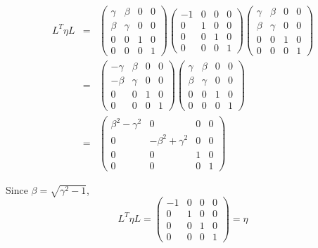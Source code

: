 \documentclass[12pt,a4paper]{article}
\begin{document}
\begin{enumerate}
\begin{eqnarray}
L^T \eta L 
&=& 
\begin{pmatrix}
\gamma & \beta & 0 & 0 \\
\beta & \gamma & 0  & 0 \\
0 & 0 & 1 & 0 \\
0 & 0 & 0 & 1
	\end{pmatrix} 
		\begin{pmatrix}
-1 & 0 & 0 & 0 \\
0 & 1 & 0  & 0 \\
0 & 0 & 1 & 0 \\
0 & 0 & 0 & 1
	\end{pmatrix}
	\begin{pmatrix}
\gamma & \beta & 0 & 0 \\
\beta & \gamma & 0  & 0 \\
0 & 0 & 1 & 0 \\
0 & 0 & 0 & 1
	\end{pmatrix}  \\
&=&
\begin{pmatrix}
-\gamma & \beta & 0 & 0 \\
-\beta & \gamma & 0  & 0 \\
0 & 0 & 1 & 0 \\
0 & 0 & 0 & 1
	\end{pmatrix}
		\begin{pmatrix}
\gamma & \beta & 0 & 0 \\
\beta & \gamma & 0  & 0 \\
0 & 0 & 1 & 0 \\
0 & 0 & 0 & 1
	\end{pmatrix} \\
&=& 
	\begin{pmatrix}
\beta^2-\gamma^2 & 0 & 0 & 0 \\
0 & -\beta^2+\gamma^2 & 0  & 0 \\
0 & 0 & 1 & 0 \\
0 & 0 & 0 & 1
	\end{pmatrix}
\end{eqnarray}

Since $\beta=\sqrt{\gamma^2-1}$,
\begin{equation}
L^T\eta L = 
	\begin{pmatrix}
-1 & 0 & 0 & 0 \\
0 & 1 & 0  & 0 \\
0 & 0 & 1 & 0 \\
0 & 0 & 0 & 1
	\end{pmatrix} = \eta
\end{equation}




\end{enumerate}
\end{document}
